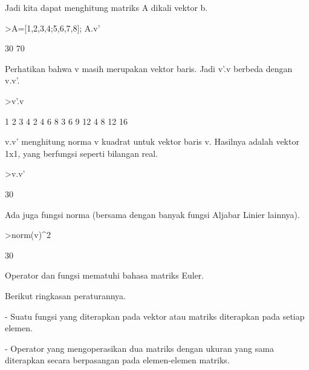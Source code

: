 \documentclass[a4paper,10pt]{article}
\begin{document}
\begin{eulernotebook}
\begin{eulercomment}
\begin{eulercomment}
\begin{eulercomment}
\begin{eulercomment}
\begin{eulercomment}
\begin{eulercomment}
\begin{eulercomment}
Jadi kita dapat menghitung matriks A dikali vektor b.
\end{eulercomment}
\begin{eulerprompt}
>A=[1,2,3,4;5,6,7,8]; A.v'
\end{eulerprompt}
\begin{euleroutput}
             30 
             70 
\end{euleroutput}
\begin{eulercomment}
Perhatikan bahwa v masih merupakan vektor baris. Jadi v'.v berbeda
dengan v.v'.
\end{eulercomment}
\begin{eulerprompt}
>v'.v
\end{eulerprompt}
\begin{euleroutput}
              1             2             3             4 
              2             4             6             8 
              3             6             9            12 
              4             8            12            16 
\end{euleroutput}
\begin{eulercomment}
v.v' menghitung norma v kuadrat untuk vektor baris v. Hasilnya adalah
vektor 1x1, yang berfungsi seperti bilangan real.
\end{eulercomment}
\begin{eulerprompt}
>v.v'
\end{eulerprompt}
\begin{euleroutput}
  30
\end{euleroutput}
\begin{eulercomment}
Ada juga fungsi norma (bersama dengan banyak fungsi Aljabar Linier
lainnya).
\end{eulercomment}
\begin{eulerprompt}
>norm(v)^2
\end{eulerprompt}
\begin{euleroutput}
  30
\end{euleroutput}
\begin{eulercomment}
Operator dan fungsi mematuhi bahasa matriks Euler.

Berikut ringkasan peraturannya.

- Suatu fungsi yang diterapkan pada vektor atau matriks diterapkan
pada setiap elemen.

- Operator yang mengoperasikan dua matriks dengan ukuran yang sama
diterapkan secara berpasangan pada elemen-elemen matriks.


\end{eulercomment}
\end{eulercomment}
\end{eulercomment}
\end{eulercomment}
\end{eulercomment}
\end{eulercomment}
\end{eulercomment}
\end{eulernotebook}
\end{document}
